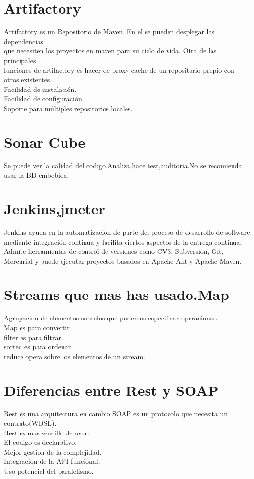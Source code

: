 \section{Artifactory}
Artifactory es un Repositorio de Maven. En el se pueden desplegar las dependencias\\
 que necesiten los proyectos en maven para su ciclo de vida. Otra de las principales\\
  funciones de artifactory es hacer de proxy cache de un repositorio propio con otros existentes.\\
  Facilidad de instalación.\\
  Facilidad de configuración.\\
  Soporte para múltiples repositorios locales.
\section{Sonar Cube}
Se puede ver la calidad del codigo.Analiza,hace test,auditoria.No se recomienda usar la BD embebida.
\section{Jenkins,jmeter}
Jenkins ayuda en la automatización de parte del proceso de desarrollo de software mediante integración continua y facilita ciertos aspectos de la entrega continua. Admite herramientas de control de versiones como CVS, Subversion, Git, Mercurial y puede ejecutar proyectos basados en Apache Ant y Apache Maven.
\section{Streams que mas has usado.Map}
Agrupacion de elementos sobrelos que podemos especificar operaciones.\\
Map es para convertir .\\
filter es para filtrar.\\
sorted es para ordenar.\\
reduce opera sobre los elementos de un stream.
\section{Diferencias entre Rest y SOAP}
Rest es una arquitectura en cambio SOAP es un protocolo que necesita un contrato(WDSL).\\
Rest es mas sencillo de usar.\\
El codigo es declarativo.\\
Mejor gestion de la complejidad.\\
Integracion de la API funcional.\\
Uso potencial del paralelismo.
